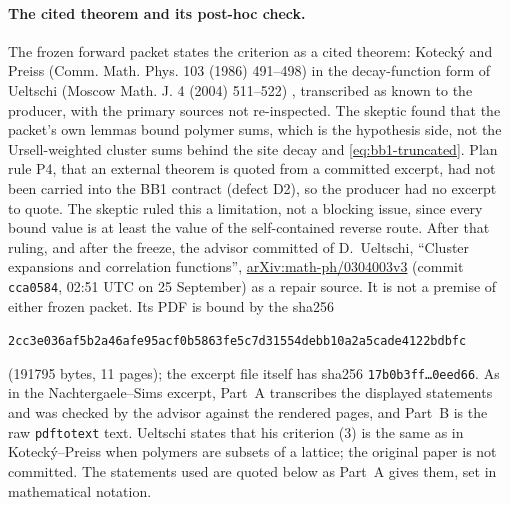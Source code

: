 \paragraph{The cited theorem and its post-hoc check.} The frozen forward
packet states the criterion as a cited theorem: Kotecký and Preiss (Comm.
Math. Phys. 103 (1986) 491--498) \cite{kp} in the decay-function form of Ueltschi
(Moscow Math. J. 4 (2004) 511--522) \cite{ueltschi}, transcribed as known to the producer,
with the primary sources not re-inspected. The skeptic found that the
packet's own lemmas bound polymer sums, which is the hypothesis side, not the
Ursell-weighted cluster sums behind the site decay and
\eqref{eq:bb1-truncated}. Plan rule P4, that an external theorem is quoted from
a committed excerpt, had not been carried into the BB1 contract (defect D2),
so the producer had no excerpt to quote. The skeptic ruled this a limitation,
not a blocking issue, since every bound value is at least the value of the
self-contained reverse route. After that ruling, and after the freeze, the
advisor committed
 of
D.~Ueltschi, ``Cluster expansions and correlation functions'',
\href{https://arxiv.org/abs/math-ph/0304003v3}{arXiv:math-ph/0304003v3}
(commit \texttt{cca0584}, 02:51 UTC on 25 September) as a repair source. It is
not a premise of either frozen packet. Its PDF is bound by the sha256
\begin{center}\small
\texttt{2cc3e036af5b2a46afe95acf0b5863fe5c7d31554debb10a2a5cade4122bdbfc}
\end{center}
(191795 bytes, 11 pages); the excerpt file itself has sha256
\texttt{17b0b3ff\ldots0eed66}. As in the Nachtergaele--Sims excerpt, Part~A
transcribes the displayed statements and was checked by the advisor against
the rendered pages, and Part~B is the raw \texttt{pdftotext} text. Ueltschi
states that his criterion (3) is the same as in Kotecký--Preiss when polymers
are subsets of a lattice; the original paper is not committed. The statements
used are quoted below as Part~A gives them, set in mathematical notation.

